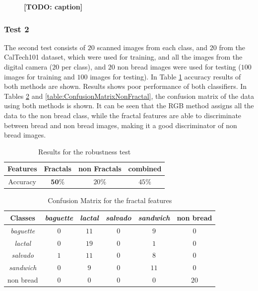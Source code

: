 \documentclass[oneside,a4paper,english,links]{amca}
\newcommand{\todo}[1]{\textbf{[TODO: #1]}}
\begin{document}
\begin{figure}
\caption{\todo{caption}}

\end{figure}

\subsubsection{Test 2}
The second test consists of $20$ scanned images from each class, and $20$ from the CalTech101 dataset, which were used for training, and all the images from the digital camera ($20$ per class), and $20$ non bread images were used for testing ($100$ images for training and $100$ images for testing). In Table \ref{table:tableRobustnessTest2} accuracy results of both methods are shown. Results shows poor performance of both classifiers. In Tables \ref{table:ConfusionMatrixFractal} and \ref{table:ConfusionMatrixNonFractal}, the confusion matrix of the data using both methods is shown. It can be seen that the RGB method assigns all the data to the non bread class, while the fractal features are able to discriminate between bread and non bread images, making it a good discriminator of non bread images.

\begin{table}[htb]
\centering
\begin{tabular}{|c|c|c|c|}
    \hline
    Features & Fractals & non Fractals & combined\\
    \hline
    \hline
    Accuracy  & $\textbf{50}\%$ & $20\%$ & $45\%$\\
    \hline
\end{tabular}
\caption{Results for the robustness test}
\label{table:tableRobustnessTest2}
\end{table}


\begin{table}[htb]
\centering
\begin{tabular}{|c|c|c|c|c|c|}
    \hline
    Classes & {\em baguette} & {\em lactal} & {\em salvado} & {\em sandwich} & non bread\\
    \hline
    \hline
    {\em baguette}  & $0$ & $11$ & $0$ & $9$  & $0$\\
    \hline
    {\em lactal}    & $0$ & $19$ & $0$ & $1$  & $0$\\
    \hline
    {\em salvado}   & $1$ & $11$ & $0$ & $8$  & $0$\\
    \hline
    {\em sandwich}  & $0$ & $9$  & $0$ & $11$ & $0$\\
    \hline
    non bread       & $0$ & $0$  & $0$ & $0$  & $20$\\
    \hline
\end{tabular}
\caption{Confusion Matrix for the fractal features}
\label{table:ConfusionMatrixFractal}
\end{table}
\end{document}
